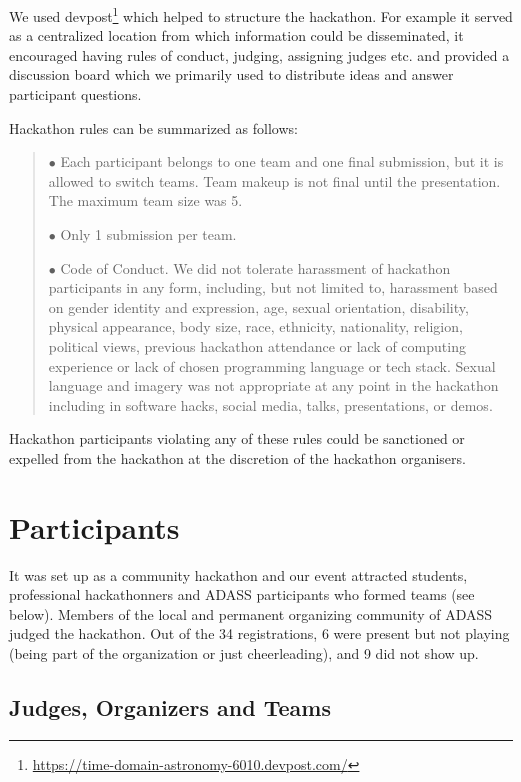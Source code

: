 \documentclass[11pt,twoside]{article}
\begin{document}
We used devpost\footnote{\url{https://time-domain-astronomy-6010.devpost.com/}} which helped to structure the hackathon. For example it served as a centralized location from which information could be disseminated,  it encouraged having rules of conduct, judging, assigning judges etc. and provided a discussion board which we primarily used to distribute ideas and answer participant questions.

Hackathon rules can be summarized as follows:

\begin{quote}
$\bullet$ Each participant belongs to one team and one final submission, but it is allowed to switch teams. Team makeup is not final until the presentation. The maximum team size was 5.

$\bullet$ Only 1 submission per team.

$\bullet$ Code of Conduct. We did not tolerate harassment of hackathon participants in any form, including, but not limited to, harassment based on gender identity and expression, age, sexual orientation, disability, physical appearance, body size, race, ethnicity, nationality, religion, political views, previous hackathon attendance or lack of computing experience or lack of chosen programming language or tech stack. Sexual language and imagery was not appropriate at any point in the hackathon including in software hacks, social media, talks, presentations, or demos.
\end{quote}

Hackathon participants violating any of these rules could be sanctioned or expelled from the hackathon at the discretion of the hackathon organisers.

\section{Participants}

It was set up as a community hackathon and our event attracted students, professional hackathonners and ADASS participants who formed teams (see below). Members of the local and permanent organizing community of ADASS judged the hackathon.  Out of the 34 registrations, 6 were present but not playing (being part of the organization or just cheerleading), and 9 did not show up.

\subsection*{Judges, Organizers and Teams}
\end{document}

